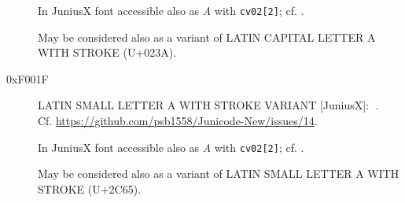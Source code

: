 \documentclass{article}
\newcommand{\Jglyph}[1]{{\relsize{2}\J#1}}
\begin{document}
\begin{description}
  In JuniusX font accessible also as \textit{A} with \texttt{cv02[2]};
  cf. \autocite[p. 7]{baker20:_opent_featur_junius_junius}.
% 

    May be considered also as a variant of LATIN CAPITAL LETTER A WITH
  STROKE (U+023A).

  
\item [0xF001F] LATIN SMALL LETTER A WITH STROKE  VARIANT [JuniusX]: 
  \Jglyph{󰀟}.\\ Cf. \url{https://github.com/psb1558/Junicode-New/issues/14}.

  In JuniusX font accessible also as \textit{A} with \texttt{cv02[2]};
  cf. \autocite[p. 7]{baker20:_opent_featur_junius_junius}.

  May be considered also as a variant of LATIN SMALL LETTER A WITH
  STROKE (U+2C65).

\end{description}

\printbibliography
\end{document}

